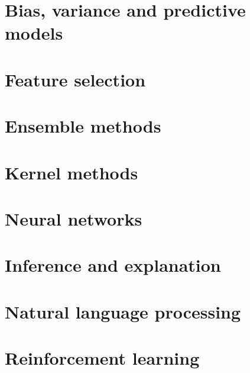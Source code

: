 \documentclass{article}
\begin{document}
    \newpage

\section{Bias, variance and predictive models}
    \newpage

\section{Feature selection}
    \newpage

\section{Ensemble methods}
    \newpage

\section{Kernel methods}
    \newpage

\section{Neural networks}
    \newpage

\section{Inference and explanation}
    \newpage

\section{Natural language processing}
    \newpage

\section{Reinforcement learning}
    \newpage
\end{document}
